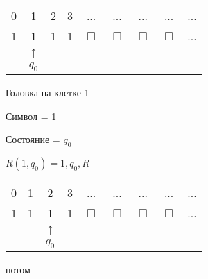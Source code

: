 \documentclass[russian]{lecture-notes}
\begin{document}
\begin{example}
\begin{table}[H]
	\centering
	\begin{tabular}{ *{9}{c} }
  \cline{1-9} 
    \multicolumn{1}{|c}{0} & 
    \multicolumn{1}{|c}{1} & 
    \multicolumn{1}{|c}{2} & 
    \multicolumn{1}{|c}{3} & 
	\multicolumn{1}{|c}{...} &     
	\multicolumn{1}{|c}{...} & 
	\multicolumn{1}{|c}{...} & 
	\multicolumn{1}{|c}{...} &     
    \multicolumn{1}{|c|}{...} \\
  \cline{1-9}
  \cline{1-9} 
    \multicolumn{1}{|c}{1} & 
    \multicolumn{1}{|c}{1} & 
    \multicolumn{1}{|c}{1} & 
    \multicolumn{1}{|c}{1} & 
	\multicolumn{1}{|c}{$\Box$} &     
	\multicolumn{1}{|c}{$\Box$} & 
	\multicolumn{1}{|c}{$\Box$} & 
	\multicolumn{1}{|c}{$\Box$} &     
    \multicolumn{1}{|c|}{...} \\
  \cline{1-9}  
       & $\uparrow$    \\
       & $q_0$
	\end{tabular}
	\end{table}	
	
	Головка на клетке 1
	
	Символ = 1
	
	Состояние = $q_0$
	
	$R(1, q_0) = 1, q_0, R$
	
	\begin{table}[H]
	
	\centering
	\begin{tabular}{ *{9}{c} }
  \cline{1-9} 
    \multicolumn{1}{|c}{0} & 
    \multicolumn{1}{|c}{1} & 
    \multicolumn{1}{|c}{2} & 
    \multicolumn{1}{|c}{3} & 
	\multicolumn{1}{|c}{...} &     
	\multicolumn{1}{|c}{...} & 
	\multicolumn{1}{|c}{...} & 
	\multicolumn{1}{|c}{...} &     
    \multicolumn{1}{|c|}{...} \\
  \cline{1-9}
  \cline{1-9} 
    \multicolumn{1}{|c}{1} & 
    \multicolumn{1}{|c}{1} & 
    \multicolumn{1}{|c}{1} & 
    \multicolumn{1}{|c}{1} & 
	\multicolumn{1}{|c}{$\Box$} &     
	\multicolumn{1}{|c}{$\Box$} & 
	\multicolumn{1}{|c}{$\Box$} & 
	\multicolumn{1}{|c}{$\Box$} &     
    \multicolumn{1}{|c|}{...} \\
  \cline{1-9}  
       & & $\uparrow$    \\
       & & $q_0$
	\end{tabular}
	\end{table}
	
	потом
	
	\begin{table}[H]
	

\end{table}
\end{example}
\end{document}
